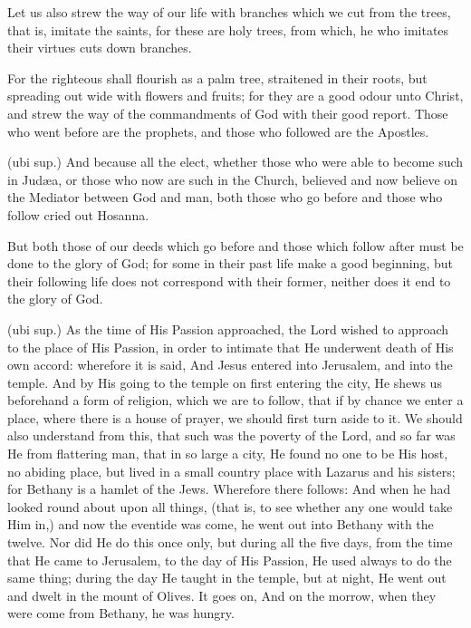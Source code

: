  Let us also strew the way of our life with branches which we cut from the trees, that is, imitate the saints, for these are holy trees, from which, he who imitates their virtues cuts down branches.

 For the righteous shall flourish as a palm tree, straitened in their roots, but spreading out wide with flowers and fruits; for they are a good odour unto Christ, and strew the way of the commandments of God with their good report. Those who went before are the prophets, and those who followed are the Apostles.

 (ubi sup.) And because all the elect, whether those who were able to become such in Judæa, or those who now are such in the Church, believed and now believe on the Mediator between God and man, both those who go before and those who follow cried out Hosanna.

 But both those of our deeds which go before and those which follow after must be done to the glory of God; for some in their past life make a good beginning, but their following life does not correspond with their former, neither does it end to the glory of God.

 

 (ubi sup.) As the time of His Passion approached, the Lord wished to approach to the place of His Passion, in order to intimate that He underwent death of His own accord: wherefore it is said, And Jesus entered into Jerusalem, and into the temple. And by His going to the temple on first entering the city, He shews us beforehand a form of religion, which we are to follow, that if by chance we enter a place, where there is a house of prayer, we should first turn aside to it. We should also understand from this, that such was the poverty of the Lord, and so far was He from flattering man, that in so large a city, He found no one to be His host, no abiding place, but lived in a small country place with Lazarus and his sisters; for Bethany is a hamlet of the Jews. Wherefore there follows: And when he had looked round about upon all things, (that is, to see whether any one would take Him in,) and now the eventide was come, he went out into Bethany with the twelve. Nor did He do this once only, but during all the five days, from the time that He came to Jerusalem, to the day of His Passion, He used always to do the same thing; during the day He taught in the temple, but at night, He went out and dwelt in the mount of Olives. It goes on, And on the morrow, when they were come from Bethany, he was hungry.

